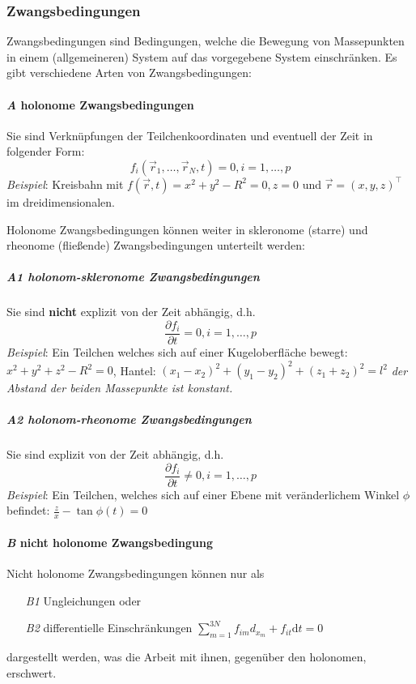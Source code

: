 \documentclass[oneside]{book}
\theoremstyle{definition}
\renewcommand{\d}{\mathrm d}
\begin{document}
\subsubsection{Zwangsbedingungen} 
Zwangsbedingungen sind Bedingungen, welche die Bewegung von Massepunkten in einem (allgemeineren) System auf das vorgegebene System einschränken. Es gibt verschiedene Arten von Zwangsbedingungen:

\paragraph{\textit{A} holonome Zwangsbedingungen} Sie sind Verknüpfungen der Teilchenkoordinaten und eventuell der
Zeit in folgender Form: $$f_i(\vec{r}_1, \dots, \vec{r}_N, t) = 0, i = 1, \dots, p$$ 
\emph{Beispiel}: Kreisbahn mit $f(\vec{r}, t) = x^2 + y^2 - R^2 = 0, z = 0$ und $\vec{r} = (x,y,z)^\top$ im dreidimensionalen.

Holonome Zwangsbedingungen können weiter in skleronome (starre) und rheonome (fließende) Zwangsbedingungen unterteilt werden:

\subparagraph{\textit{A1} holonom-skleronome Zwangsbedingungen} Sie sind \textbf{nicht} explizit von der Zeit abhängig, d.h.
$$ \frac{\partial f_i}{\partial t} = 0, i = 1, \dots, p$$
\emph{Beispiel}: Ein Teilchen welches sich auf einer Kugeloberfläche bewegt: $x^2 + y^2 + z^2 - R^2 = 0$, Hantel: $(x_1 - x_2)^2 + (y_1 - y_2)^2 + (z_1 + z_2)^2 = l^2$ \textit{der Abstand der beiden Massepunkte ist konstant.}

\subparagraph{\textit{A2} holonom-rheonome Zwangsbedingungen} Sie sind explizit von der Zeit abhängig, d.h.
$$ \frac{\partial f_i}{\partial t} \neq 0, i = 1, \dots, p$$
\emph{Beispiel}: Ein Teilchen, welches sich auf einer Ebene mit veränderlichem Winkel $\phi$ befindet: $\frac{z}{x} - \tan{\phi(t)} = 0$


\paragraph{\textit{B} nicht holonome Zwangsbedingung}
Nicht holonome Zwangsbedingungen können nur als 
\begin{itemize}
	\item[\textit{B1}] Ungleichungen oder
	\item[\textit{B2}] differentielle Einschränkungen
	$ \sum_{m = 1}^{3N} f_{im} d_{x_m} + f_{it} \d t = 0$
\end{itemize}
dargestellt werden, was die Arbeit mit ihnen, gegenüber den holonomen, erschwert. 
\end{document}
